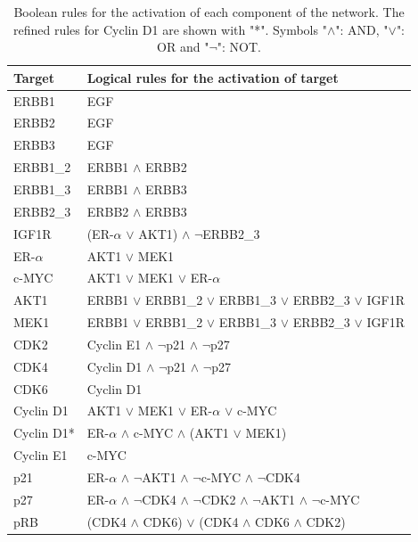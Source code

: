 \documentclass[a4paper,12pt]{article}
\begin{document}
\begin{table}[ht!]
    \centering
    \begin{tabular}{lp{}}
        \toprule
        \textbf{Target} & \textbf{Logical rules for the activation of target} \\ 
        \midrule
        ERBB1 & EGF \\ 
        ERBB2 & EGF \\ 
        ERBB3 & EGF \\ 
        ERBB1\_2 & ERBB1 $\wedge$ ERBB2 \\ 
        ERBB1\_3 & ERBB1 $\wedge$ ERBB3 \\ 
        ERBB2\_3 & ERBB2 $\wedge$ ERBB3 \\ 
        IGF1R & (ER-$\alpha$ $\vee$ AKT1) $\wedge$ $\neg$ERBB2\_3 \\ 
        ER-$\alpha$ & AKT1 $\vee$ MEK1 \\ 
        c-MYC & AKT1 $\vee$ MEK1 $\vee$ ER-$\alpha$ \\ 
        AKT1 & ERBB1 $\vee$ ERBB1\_2 $\vee$ ERBB1\_3 $\vee$ ERBB2\_3 $\vee$ IGF1R \\ 
        MEK1 & ERBB1 $\vee$ ERBB1\_2 $\vee$ ERBB1\_3 $\vee$ ERBB2\_3 $\vee$ IGF1R \\ 
        CDK2 & Cyclin E1 $\wedge$ $\neg$p21 $\wedge$ $\neg$p27 \\ 
        CDK4 & Cyclin D1 $\wedge$ $\neg$p21 $\wedge$ $\neg$p27 \\ 
        CDK6 & Cyclin D1 \\ 
        Cyclin D1 & AKT1 $\vee$ MEK1 $\vee$ ER-$\alpha$ $\vee$ c-MYC \\ 
        Cyclin D1* & ER-$\alpha$ $\wedge$ c-MYC $\wedge$ (AKT1 $\vee$ MEK1) \\ 
        Cyclin E1 & c-MYC \\ 
        p21 & ER-$\alpha$ $\wedge$ $\neg$AKT1 $\wedge$ $\neg$c-MYC $\wedge$ $\neg$CDK4 \\ 
        p27 & ER-$\alpha$ $\wedge$ $\neg$CDK4 $\wedge$ $\neg$CDK2 $\wedge$ $\neg$AKT1 $\wedge$ $\neg$c-MYC \\
        pRB & (CDK4 $\wedge$ CDK6) $\vee$ (CDK4 $\wedge$ CDK6 $\wedge$ CDK2) \\
        \bottomrule
    \end{tabular}
    \caption{Boolean rules for the activation of each component of the network. The refined rules for Cyclin D1 are shown with "*". Symbols "$\wedge$": AND, "$\vee$": OR and "$\neg$": NOT.}
    \label{tab:boolean_rules}
\end{table}
\end{document}
